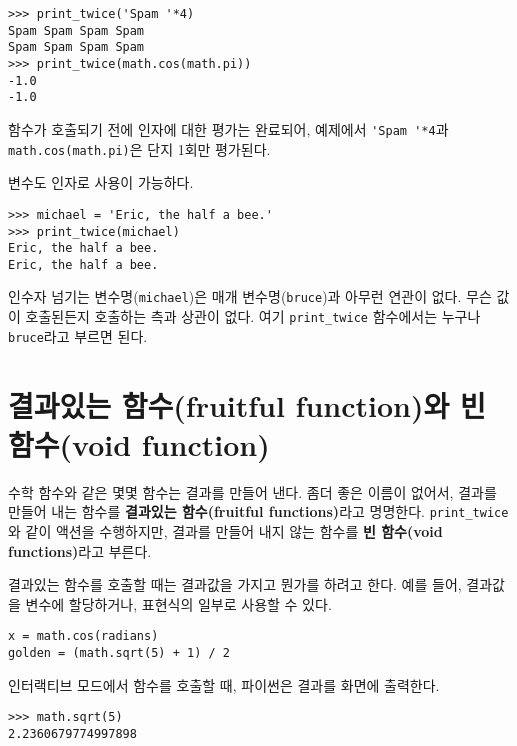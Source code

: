 
\beforeverb
\begin{verbatim}
>>> print_twice('Spam '*4)
Spam Spam Spam Spam
Spam Spam Spam Spam
>>> print_twice(math.cos(math.pi))
-1.0
-1.0
\end{verbatim}
\afterverb
%

함수가 호출되기 전에 인자에 대한 평가는 완료되어, 
예제에서 \verb"'Spam '*4"과 {\tt math.cos(math.pi)}은 단지 1회만 평가된다.


변수도 인자로 사용이 가능하다.

\beforeverb
\begin{verbatim}
>>> michael = 'Eric, the half a bee.'
>>> print_twice(michael)
Eric, the half a bee.
Eric, the half a bee.
\end{verbatim}
\afterverb
%

인수자 넘기는 변수명({\tt michael})은 매개 변수명({\tt bruce})과 아무런 연관이 없다.
무슨 값이 호출된든지 호출하는 측과 상관이 없다. 
여기 \verb"print_twice" 함수에서는 누구나 {\tt bruce}라고 부르면 된다.

\section{결과있는 함수(fruitful function)와 빈 함수(void function)}


수학 함수와 같은 몇몇 함수는 결과를 만들어 낸다. 
좀더 좋은 이름이 없어서, 결과를 만들어 내는 함수를 {\bf 결과있는 함수(fruitful functions)}라고 명명한다.
\verb"print_twice"와 같이 액션을 수행하지만, 결과를 만들어 내지 않는 함수를 {\bf 빈 함수(void functions)}라고 부른다.

결과있는 함수를 호출할 때는 결과값을 가지고 뭔가를 하려고 한다. 
예를 들어, 결과값을 변수에 할당하거나, 표현식의 일부로 사용할 수 있다.

\beforeverb
\begin{verbatim}
x = math.cos(radians)
golden = (math.sqrt(5) + 1) / 2
\end{verbatim}
\afterverb
%

인터랙티브 모드에서 함수를 호출할 때, 파이썬은 결과를 화면에 출력한다.

\beforeverb
\begin{verbatim}
>>> math.sqrt(5)
2.2360679774997898
\end{verbatim}
\afterverb
%

